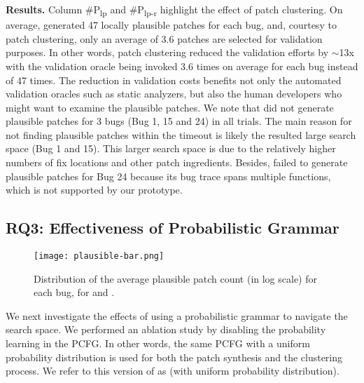 \textbf{Results.} 
Column \#P\textsubscript{lp} and \#P\textsubscript{lp-r} highlight the effect of patch clustering.
On average, \tool generated 47 locally plausible patches for each bug, and, courtesy to patch clustering, only an average of 3.6 patches are selected for validation purposes. 
In other words, patch clustering reduced the validation efforts by $\sim$13x
with the validation oracle being invoked 3.6 times on average for each bug instead of 47 times.
The reduction in validation costs benefits not only the automated validation oracles such as static analyzers, but also the human developers who might want to examine the plausible patches. 
We note that \tool did not generate plausible patches for 3 bugs (Bug 1, 15 and 24) in all trials. 
The main reason for not finding plausible patches within the timeout is likely the resulted large search space (Bug 1 and 15). 
This larger search space is due to the relatively higher numbers of fix locations and other patch ingredients.
Besides, \tool failed to generate plausible patches for Bug 24 because its bug trace spans multiple functions, which is not supported by our prototype.


\subsection{RQ3: Effectiveness of Probabilistic Grammar}\label{sec:rq3}

\begin{figure}[t]
\scriptsize
\centering

\texttt{[image: plausible-bar.png]}
\caption{Distribution of the average plausible patch count (in log scale) for each bug, for \tool and \tooluni.}
\label{fig:plausible-distribution}
\end{figure}

We next investigate the effects of using a probabilistic grammar to navigate the search space. 
We performed an ablation study by disabling the probability learning in the PCFG.
In other words, the same PCFG with a uniform probability distribution 
is used for both  the patch synthesis and the clustering process.
We refer to this version of \tool as \tooluni (with uniform probability distribution).


